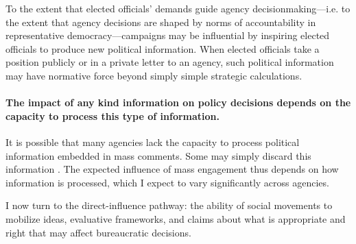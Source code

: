 To the extent that elected officials' demands guide agency decisionmaking---i.e. to the extent that agency decisions are shaped by norms of accountability in representative democracy---campaigns may be influential by inspiring elected officials to produce new political information. When elected officials take a position publicly or in a private letter to an agency, such political information may have normative force beyond simply simple strategic calculations.





\paragraph{The impact of any kind information on policy decisions depends on the capacity to process this type of information.}
It is possible that many agencies lack the capacity to process political information embedded in mass comments. Some may simply discard this information \citep{Mendelson2011}. The expected influence of mass engagement thus depends on how information is processed, which I expect to vary significantly across agencies. 







I now turn to the direct-influence pathway: the ability of social movements to mobilize ideas, evaluative frameworks, and claims about what is appropriate and right that may affect bureaucratic decisions. %

